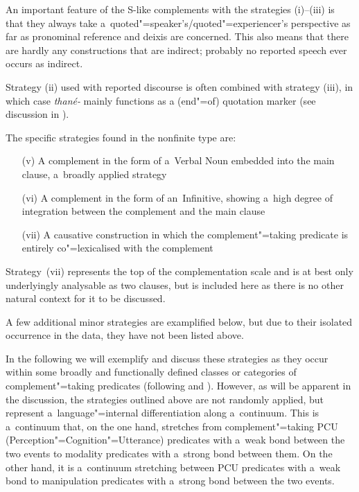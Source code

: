 An important feature of the S-like complements with the strategies (i)--(iii) is that they always take a~quoted"=speaker's/quoted"=experiencer's perspective as far as pronominal reference and deixis are concerned. This also means that there are hardly any constructions that are indirect; probably no reported speech ever occurs as indirect.


Strategy (ii) used with reported discourse is often combined with strategy (iii), in which case \textit{thané-} mainly functions as a (end"=of) quotation marker (see discussion in ).


The specific strategies found in the nonfinite type are:

\begin{enumerate}
\item[(v)] A complement in the form of a~Verbal Noun embedded into the main clause, a~broadly applied strategy
\item[(vi)] A complement in the form of an~Infinitive, showing a~high degree of integration between the complement and the main clause
\item[(vii)] A causative construction in which the complement"=taking predicate is entirely co"=lexicalised with the complement
\end{enumerate}
Strategy~(vii) represents the top of the complementation scale \citep[74]{givon2001b} and is at best only underlyingly analysable as two clauses, but is included here as there is no other natural context for it to be discussed.


A few additional minor strategies are examplified below, but due to their isolated occurrence in the data, they have not been listed above.



In the following we will exemplify and discuss these strategies as they occur within some broadly and functionally defined classes or categories of complement"=taking predicates (following \citealt[40--59]{givon2001b} and \citealt[120--145]{noonan2007}). However, as will be apparent in the discussion, the strategies outlined above are not randomly applied, but represent a~language"=internal differentiation along a~continuum. This is a~continuum that, on the one hand, stretches from complement"=taking PCU (Perception"=Cognition"=Utterance) predicates with a~weak bond between the two events to modality predicates with a~strong bond between them. On the other hand, it is a~continuum stretching between PCU predicates with a~weak bond to manipulation predicates with a~strong bond between the two events.


